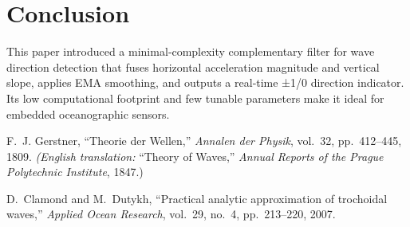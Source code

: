 \documentclass[11pt,letterpaper]{article}
\begin{document}
\section{Conclusion}
This paper introduced a minimal‐complexity complementary filter for wave direction detection that fuses horizontal acceleration magnitude and vertical slope, applies EMA smoothing, and outputs a real‐time ±1/0 direction indicator.  Its low computational footprint and few tunable parameters make it ideal for embedded oceanographic sensors.

\begin{thebibliography}{9}
F.~J. Gerstner, ``Theorie der Wellen,'' 
\emph{Annalen der Physik}, vol.~32, pp.~412–445, 1809.  
\emph{(English translation: }``Theory of Waves,'' \emph{Annual Reports of the Prague Polytechnic Institute}, 1847.)

D.~Clamond and M.~Dutykh, ``Practical analytic approximation of trochoidal waves,'' 
\emph{Applied Ocean Research}, vol.~29, no.~4, pp.~213–220, 2007.
\end{thebibliography}
\end{document}
